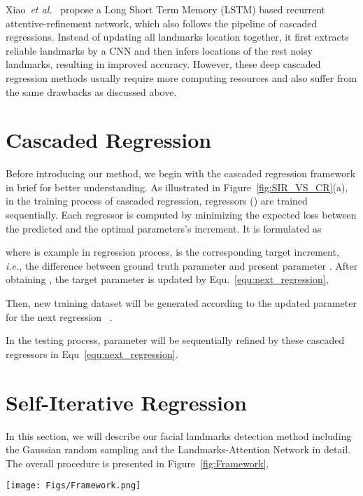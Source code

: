 \documentclass[letterpaper]{article} \usepackage{aaai18}  \usepackage{times}  \usepackage{helvet}  \usepackage{courier}  \usepackage{url}  \usepackage{graphicx}
\def\ie{{\em i.e.}}
\def\etal{{\em et al.}}
\begin{document}
Xiao~\etal~\cite{XiaoFXLYK:RAR:ECCV2016} propose a Long Short Term Memory (LSTM) based recurrent attentive-refinement network, which also follows the pipeline of cascaded regressions. Instead of updating all landmarks location together, it first extracts reliable landmarks by a CNN and then infers locations of the rest noisy landmarks, resulting in improved accuracy. However, these deep cascaded regression methods usually require more computing resources and also suffer from the same drawbacks as discussed above.

\section{Cascaded Regression}
Before introducing our method, we begin with the cascaded regression framework in brief for better understanding. As illustrated in Figure~\ref{fig:SIR_VS_CR}(a), in the training process of cascaded regression,  regressors () are trained sequentially. Each regressor  is computed by minimizing the expected loss between the predicted and the optimal parameters's increment. It is formulated as

where  is  example in  regression process,   is the corresponding target increment, \ie, the difference between ground truth parameter  and present parameter . After obtaining , the target parameter is updated by Equ.~\eqref{equ:next_regression},


Then, new training dataset will be generated according to the updated parameter for the next regression ~\cite{Xiong:SDM:CVPR2013}.

In the testing process, parameter will be sequentially refined by these cascaded regressors in Equ~\ref{equ:next_regression}.

\section{Self-Iterative Regression}\label{framework}
In this section, we will describe our facial landmarks detection method including the Gaussian random sampling and the Landmarks-Attention Network in detail. The overall procedure is presented in Figure~\ref{fig:Framework}.
\begin{figure*}[t]
\centering
\texttt{[image: Figs/Framework.png]}
\caption{Training and testing process of the proposed SIR. (a) random sampling process. (b) Landmarks-Attention Network. (c) Iterative predicting and updating process. The training process consists of (a) and (b), while the testing process consists of (b) and (c). In the figure, one of the dimension of facial Landmarks Model parameter  is showed, and  is landmarks' location parameter.}
\label{fig:Framework}
\end{figure*}
\end{document}
